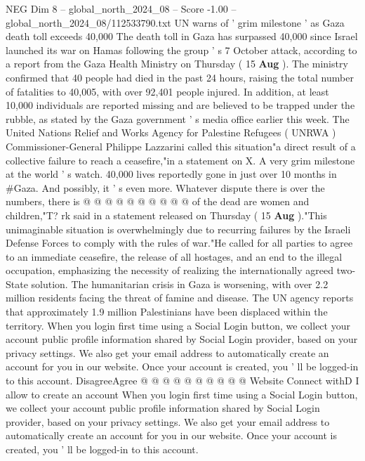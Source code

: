 \begin{textsample}{NEG Dim 8 – global\_north\_2024\_08 – Score -1.00 – global\_north\_2024\_08/112533790.txt}  \label{ex:f8_neg_127}
UN warns of ' grim milestone ' as Gaza death toll exceeds 40,000 The death toll in Gaza has surpassed 40,000 since Israel launched its war on Hamas following the group ' s 7 October attack, according to a report from the Gaza Health Ministry on Thursday ( 15 \textbf{Aug} ).
The ministry confirmed that 40 people had died in the past 24 hours, raising the total number of fatalities to 40,005, with over 92,401 people injured.
In addition, at least 10,000 individuals are reported missing and are believed to be trapped under the rubble, as stated by the Gaza government ' s media office earlier this week.
The United Nations Relief and Works Agency for Palestine Refugees ( UNRWA ) Commissioner-General Philippe Lazzarini called this situation"a direct result of a collective failure to reach a ceasefire,"in a statement on X.
A very grim milestone at the world ' s watch. 40,000 lives reportedly gone in just over 10 months in \#Gaza.
And possibly, it ' s even more.
Whatever dispute there is over the numbers, there is @ @ @ @ @ @ @ @ @ @ of the dead are women and children,"T? rk said in a statement released on Thursday ( 15 \textbf{Aug} )."This unimaginable situation is overwhelmingly due to recurring failures by the Israeli Defense Forces to comply with the rules of war."He called for all parties to agree to an immediate ceasefire, the release of all hostages, and an end to the illegal occupation, emphasizing the necessity of realizing the internationally agreed two-State solution.
The humanitarian crisis in Gaza is worsening, with over 2.2 million residents facing the threat of famine and disease.
The UN agency reports that approximately 1.9 million Palestinians have been displaced within the territory.
When you login first time using a Social Login button, we collect your account public profile information shared by Social Login provider, based on your privacy settings.
We also get your email address to automatically create an account for you in our website.
Once your account is created, you ' ll be logged-in to this account.
DisagreeAgree @ @ @ @ @ @ @ @ @ @ Website Connect withD I allow to create an account When you login first time using a Social Login button, we collect your account public profile information shared by Social Login provider, based on your privacy settings.
We also get your email address to automatically create an account for you in our website.
Once your account is created, you ' ll be logged-in to this account.

\end{textsample}
